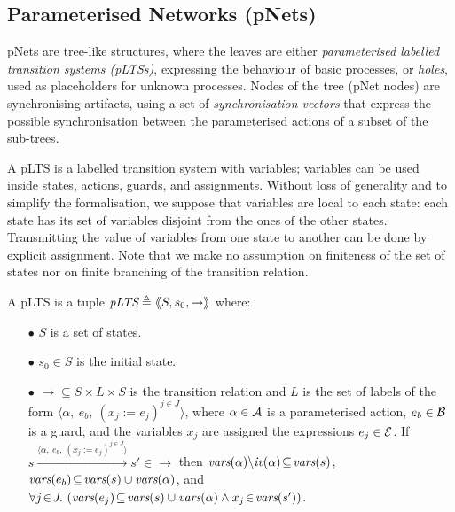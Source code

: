 \documentclass{lncs/llncs}
\newcommand{\LUDO}[1]{\textcolor{darkgreen}{#1}}
\begin{document}
\subsection*{Parameterised Networks (pNets)}
\label{section:pnets}

pNets are tree-like structures, where the leaves are either
\emph{parameterised labelled transition systems (pLTSs)}, expressing the
behaviour of basic processes, or \emph{holes}, used as placeholders
for unknown processes. 
Nodes of the tree (pNet nodes) are synchronising artifacts, using a
set of \emph{synchronisation vectors} that express the possible
synchronisation between the parameterised actions of a subset of the
sub-trees.



A pLTS is a labelled transition system with variables; variables can be
used inside states, actions, guards, and
assignments. Without loss of generality and to simplify the formalisation, we suppose 
 that variables are local to each 
state: each state has its set of variables disjoint from the ones of the other states. Transmitting the value of
variables from one state to another can be done by explicit assignment. 
Note that we make no assumption on finiteness of the set of states nor
on finite branching of the transition relation.

\begin{definition}[pLTS]
\label{pLTS}
A pLTS is a tuple
$\pLTS\triangleq\mylangle S,s_0, \to\myrangle$ where:
\begin{itemize}
\item[$\bullet$]
$S$ is a set of states.
\item[$\bullet$]
$s_0 \in S$ is the initial state.
\item[$\bullet$] $\to \subseteq S \times L \times S$ is the transition relation and 
$L$ is the set of labels of the form
$\langle \alpha,~e_b,~(x_j\!:= {e}_j)^{j\in J}\rangle$,
where $\alpha \in\mathcal{A}$ is a parameterised action, $e_b \in
\mathcal{B}$ is a guard, and the variables $x_j$ 
are assigned the expressions $e_j\in \mathcal{E}$.
If 
$s \xrightarrow{\langle \alpha,~e_b,~(x_j\!:= {e}_j)^{j\in
		J}\rangle} s'\in \to $ then 
		$\vars(\alpha)\backslash \iv(\alpha)\!\subseteq\! \vars(s)$, 
		$\vars(e_b)\!\subseteq\! \vars(s)\cup\vars(\alpha)$, and
		$\forall j\!\in\! J .\,\left(\vars(e_j)\!\subseteq\! \vars(s)\cup\vars(\alpha)\land 
		x_j\!\in\!\vars(s') \right)$. %
\end{itemize}
\end{definition}
\end{document}
